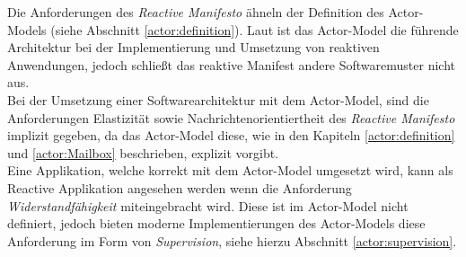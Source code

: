 Die Anforderungen des \textit{Reactive Manifesto} ähneln der Definition des Actor-Models (siehe Abschnitt \ref{actor:definition}). Laut \cite{Vernon2015ReactiveAkka} ist das Actor-Model die führende Architektur bei der Implementierung und Umsetzung von reaktiven Anwendungen, jedoch schließt das reaktive Manifest andere Softwaremuster nicht aus. \\
Bei der Umsetzung einer Softwarearchitektur mit dem Actor-Model, sind die Anforderungen Elastizität sowie Nachrichtenorientiertheit des \textit{Reactive Manifesto} implizit gegeben, da das Actor-Model diese, wie in den Kapiteln \ref{actor:definition} und  \ref{actor:Mailbox} beschrieben, explizit vorgibt.\\
Eine Applikation, welche korrekt mit dem Actor-Model umgesetzt wird, kann als Reactive Applikation angesehen werden wenn die Anforderung \textit{Widerstandfähigkeit} miteingebracht wird. Diese ist im Actor-Model nicht definiert, jedoch bieten moderne Implementierungen des Actor-Models diese Anforderung im Form von \textit{Supervision}, siehe hierzu Abschnitt \ref{actor:supervision}.
